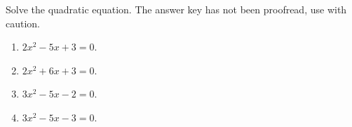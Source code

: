 Solve the quadratic equation. The answer key has not been proofread, use with caution.
\begin{enumerate}[ref={\fcProblemRef}]
\item $2x^2-5x+3=0$.

\item $2x^2+6x+3=0$.

\item $3x^2-5x-2=0$.

\item $3x^2-5x-3=0$.

\end{enumerate}